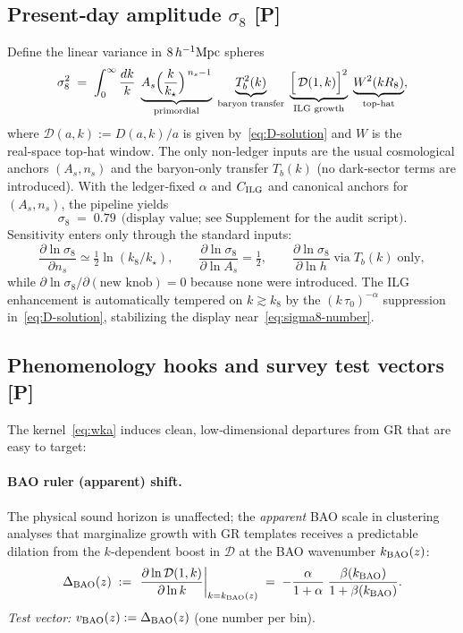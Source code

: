 \documentclass[11pt]{article}
\begin{document}
\subsection{Present‑day amplitude $\sigma_{8}$ [P]}
Define the linear variance in $8\,h^{-1}{\rm Mpc}$ spheres
\begin{equation}
\label{eq:sigma8-def}
\sigma_{8}^{2}\;=\;\int_{0}^{\infty}\frac{dk}{k}\;
\underbrace{A_{s}\Bigl(\frac{k}{k_{\star}}\Bigr)^{\,n_{s}-1}}_{\text{primordial}}\;
\underbrace{T_{b}^{2}(k)}_{\text{baryon transfer}}\;
\underbrace{\Bigl[\,\mathcal D(1,k)\Bigr]^{2}}_{\text{ILG growth}}\;
\underbrace{W^{2}(kR_{8})}_{\text{top‑hat}},
\end{equation}
where $\mathcal D(a,k):=D(a,k)/a$ is given by~\eqref{eq:D-solution} and $W$ is the real‑space top‑hat window. The only non‑ledger inputs are the usual cosmological anchors $(A_{s},n_{s})$ and the baryon‑only transfer $T_{b}(k)$ (no dark‑sector terms are introduced). With the ledger‑fixed $\alpha$ and $C_{\rm ILG}$ and canonical anchors for $(A_{s},n_{s})$, the pipeline yields
\begin{equation}
\label{eq:sigma8-number}
\boxed{\;\sigma_{8}\;=\;0.79\ \ \text{(display value; see Supplement for the audit script).}\;}
\end{equation}
Sensitivity enters only through the standard inputs:
\[
\frac{\partial\ln\sigma_{8}}{\partial n_{s}}\simeq \tfrac12\ln(k_{8}/k_{\star}),\qquad
\frac{\partial\ln\sigma_{8}}{\partial\ln A_{s}}=\tfrac12,\qquad
\frac{\partial\ln\sigma_{8}}{\partial\ln h}\;\text{via}\;T_{b}(k)\;\text{only},
\]
while $\partial\ln\sigma_{8}/\partial(\text{new knob})=0$ because none were introduced. The ILG enhancement is automatically tempered on $k\!\gtrsim\!k_{8}$ by the $(k\,\tau_{0})^{-\alpha}$ suppression in~\eqref{eq:D-solution}, stabilizing the display near~\eqref{eq:sigma8-number}.

\subsection{Phenomenology hooks and survey test vectors [P]}
The kernel~\eqref{eq:wka} induces clean, low‑dimensional departures from GR that are easy to target:

\paragraph{BAO ruler (apparent) shift.}
The physical sound horizon is unaffected; the \emph{apparent} BAO scale in clustering analyses that marginalize growth with GR templates receives a predictable dilation from the $k$‑dependent boost in $\mathcal D$ at the BAO wavenumber $k_{\rm BAO}(z)$:
\begin{equation}
\Delta_{\rm BAO}(z)\;:=\;\left.\frac{\partial\ln\mathcal D(1,k)}{\partial\ln k}\right|_{k=k_{\rm BAO}(z)}
\;=\;-\frac{\alpha}{1+\alpha}\;\frac{\beta(k_{\rm BAO})}{1+\beta(k_{\rm BAO})}.
\end{equation}
\emph{Test vector:} $v_{\rm BAO}(z):=\Delta_{\rm BAO}(z)$ (one number per bin).
\end{document}
